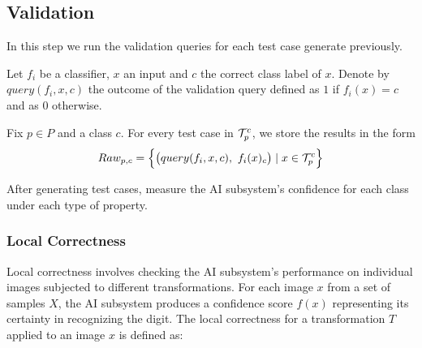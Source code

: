 \documentclass[10pt, conference, a4paper, final]{IEEEtran}
\begin{document}



\subsection{Validation}

In this step we run the validation queries for each test case generate previously.

Let $f_i$ be a classifier, $x$ an input and $c$ the correct class label of $x$.  Denote by $query(f_i,x,c)$ the outcome of the validation query defined as $1$ if $f_i(x)=c$ and as $0$ otherwise. 

Fix $p\in P$ and a class $c$. For every test case in $\mathcal{T}_p^c$, we store the results in the form \[Raw_{p,c} = \Big\{\big(query(f_i,x,c),\ f_i(x)_c\big) \mid x \in \mathcal{T}_p^c\Big\}\]  



After generating test cases, measure the  AI subsystem's confidence for each class under each type of property.


    \subsubsection{Local Correctness}

    Local correctness involves checking the AI subsystem's performance on individual images subjected to different transformations. For each image $x$ from a set of samples $X$, the AI subsystem produces a confidence score $f(x)$ representing its certainty in recognizing the digit. The local correctness for a transformation $T$ applied to an image $x$ is defined as:
\end{document}
